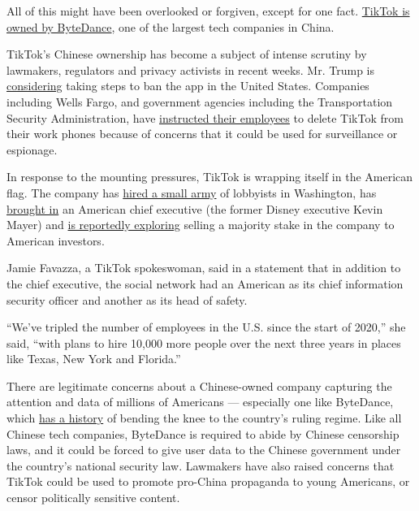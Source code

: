 All of this might have been overlooked or forgiven, except for one fact.
\href{https://www.nytimes.com/2020/08/03/technology/tiktok-trump-sale-microsoft.html}{TikTok
is owned by ByteDance}, one of the largest tech companies in China.

TikTok's Chinese ownership has become a subject of intense scrutiny by
lawmakers, regulators and privacy activists in recent weeks. Mr. Trump
is
\href{https://www.nytimes.com/reuters/2020/07/20/technology/20reuters-usa-election-trump-tiktok.html}{considering}
taking steps to ban the app in the United States. Companies including
Wells Fargo, and government agencies including the Transportation
Security Administration, have
\href{https://www.theverge.com/2020/7/11/21320935/wells-fargo-bans-tiktok-devices-amazon-pompeo}{instructed
their employees} to delete TikTok from their work phones because of
concerns that it could be used for surveillance or espionage.

In response to the mounting pressures, TikTok is wrapping itself in the
American flag. The company has
\href{https://www.nytimes.com/2020/07/15/technology/tiktok-washington-lobbyist.html}{hired
a small army} of lobbyists in Washington, has
\href{https://www.nytimes.com/2020/05/18/business/media/tiktok-ceo-kevin-mayer.html}{brought
in} an American chief executive (the former Disney executive Kevin
Mayer) and
\href{https://www.nytimes.com/2020/07/23/business/dealbook/tiktok-bytedance-investors-trump.html}{is
reportedly exploring} selling a majority stake in the company to
American investors.

Jamie Favazza, a TikTok spokeswoman, said in a statement that in
addition to the chief executive, the social network had an American as
its chief information security officer and another as its head of
safety.

``We've tripled the number of employees in the U.S. since the start of
2020,'' she said, ``with plans to hire 10,000 more people over the next
three years in places like Texas, New York and Florida.''

There are legitimate concerns about a Chinese-owned company capturing
the attention and data of millions of Americans --- especially one like
ByteDance, which
\href{https://www.nytimes.com/2019/11/05/business/tiktok-china-bytedance.html}{has
a history} of bending the knee to the country's ruling regime. Like all
Chinese tech companies, ByteDance is required to abide by Chinese
censorship laws, and it could be forced to give user data to the Chinese
government under the country's national security law. Lawmakers have
also raised concerns that TikTok could be used to promote pro-China
propaganda to young Americans, or censor politically sensitive content.

